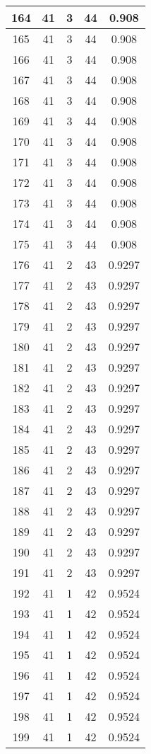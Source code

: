 \documentclass[letterpaper, 12pt]{article}
\begin{document}
\begin{longtable}{|c|c|c|c|c|}
\hline
164 & 41 & 3 & 44 & 0.908 \\
\hline
165 & 41 & 3 & 44 & 0.908 \\
\hline
166 & 41 & 3 & 44 & 0.908 \\
\hline
167 & 41 & 3 & 44 & 0.908 \\
\hline
168 & 41 & 3 & 44 & 0.908 \\
\hline
169 & 41 & 3 & 44 & 0.908 \\
\hline
170 & 41 & 3 & 44 & 0.908 \\
\hline
171 & 41 & 3 & 44 & 0.908 \\
\hline
172 & 41 & 3 & 44 & 0.908 \\
\hline
173 & 41 & 3 & 44 & 0.908 \\
\hline
174 & 41 & 3 & 44 & 0.908 \\
\hline
175 & 41 & 3 & 44 & 0.908 \\
\hline
176 & 41 & 2 & 43 & 0.9297 \\
\hline
177 & 41 & 2 & 43 & 0.9297 \\
\hline
178 & 41 & 2 & 43 & 0.9297 \\
\hline
179 & 41 & 2 & 43 & 0.9297 \\
\hline
180 & 41 & 2 & 43 & 0.9297 \\
\hline
181 & 41 & 2 & 43 & 0.9297 \\
\hline
182 & 41 & 2 & 43 & 0.9297 \\
\hline
183 & 41 & 2 & 43 & 0.9297 \\
\hline
184 & 41 & 2 & 43 & 0.9297 \\
\hline
185 & 41 & 2 & 43 & 0.9297 \\
\hline
186 & 41 & 2 & 43 & 0.9297 \\
\hline
187 & 41 & 2 & 43 & 0.9297 \\
\hline
188 & 41 & 2 & 43 & 0.9297 \\
\hline
189 & 41 & 2 & 43 & 0.9297 \\
\hline
190 & 41 & 2 & 43 & 0.9297 \\
\hline
191 & 41 & 2 & 43 & 0.9297 \\
\hline
192 & 41 & 1 & 42 & 0.9524 \\
\hline
193 & 41 & 1 & 42 & 0.9524 \\
\hline
194 & 41 & 1 & 42 & 0.9524 \\
\hline
195 & 41 & 1 & 42 & 0.9524 \\
\hline
196 & 41 & 1 & 42 & 0.9524 \\
\hline
197 & 41 & 1 & 42 & 0.9524 \\
\hline
198 & 41 & 1 & 42 & 0.9524 \\
\hline
199 & 41 & 1 & 42 & 0.9524 \\
\hline
\end{longtable}
\end{document}
